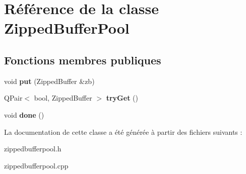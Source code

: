 \hypertarget{class_zipped_buffer_pool}{\section{Référence de la classe Zipped\+Buffer\+Pool}
\label{class_zipped_buffer_pool}
}
\subsection*{Fonctions membres publiques}
\begin{DoxyCompactItemize}
\item 
\hypertarget{class_zipped_buffer_pool_a037407941a57c1635d8ac6b801bdeb10}{void {\bfseries put} (Zipped\+Buffer \&zb)}\label{class_zipped_buffer_pool_a037407941a57c1635d8ac6b801bdeb10}

\item 
\hypertarget{class_zipped_buffer_pool_a917f556fb4c7615067515570cebf9bb6}{Q\+Pair$<$ bool, Zipped\+Buffer $>$ {\bfseries try\+Get} ()}\label{class_zipped_buffer_pool_a917f556fb4c7615067515570cebf9bb6}

\item 
\hypertarget{class_zipped_buffer_pool_a40bcbbd5245bda82c1167baa4b677e4a}{void {\bfseries done} ()}\label{class_zipped_buffer_pool_a40bcbbd5245bda82c1167baa4b677e4a}

\end{DoxyCompactItemize}


La documentation de cette classe a été générée à partir des fichiers suivants \+:\begin{DoxyCompactItemize}
\item 
zippedbufferpool.\+h\item 
zippedbufferpool.\+cpp\end{DoxyCompactItemize}
